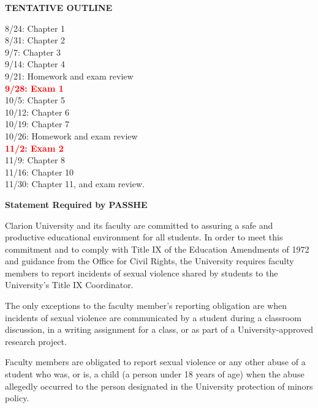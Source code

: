 \documentclass{article}
\begin{document}
\vspace*{5pt}
\begin{center}
{\bf TENTATIVE OUTLINE}
\end{center}
8/24:  Chapter 1 \\
8/31:  Chapter 2\\
9/7: Chapter 3\\
9/14: Chapter 4 \\
9/21:  Homework and exam review \\
{\bf \textcolor{red}{9/28:  Exam 1}} \\
10/5: Chapter 5\\
10/12: Chapter 6\\
10/19:  Chapter 7\\ 
10/26:  Homework and exam review \\ 
{\bf \textcolor{red}{11/2:  Exam 2}}\\
11/9: Chapter 8\\
11/16: Chapter 10\\
11/30: Chapter 11, and exam review.\\

\clearpage

\begin{center}
{\bf Statement Required by PASSHE}  
\end{center}

Clarion University and its faculty are committed to assuring a safe and productive educational environment for all students. In order to meet this commitment and to comply with Title IX of the Education Amendments of 1972 and guidance from  the Office for Civil Rights, the University requires faculty members to report incidents of sexual violence shared by students to the University's Title IX Coordinator.                         

The only exceptions to the faculty member's reporting obligation are when incidents of sexual violence are communicated by a student during a classroom discussion, in a writing assignment for a class, or as part of a University-approved research project.                           

Faculty members are obligated to report sexual violence or any other abuse of a student who was, or is, a child (a person under 18 years of age) when the abuse allegedly occurred to the person designated in the University protection of minors policy. 
\end{document}
